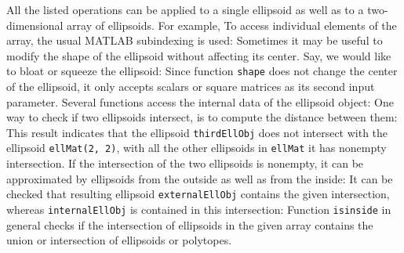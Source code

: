 All the listed operations can be applied to a single ellipsoid as well as to
a two-dimensional array of ellipsoids.
For example,
To access individual elements of the array, the usual MATLAB subindexing
is used:
Sometimes it may be useful to modify the shape of the ellipsoid without
affecting its center. Say, we would like to bloat or squeeze the ellipsoid:
Since function {\tt shape} does not change the center of the ellipsoid,
it only accepts scalars or square matrices as its second input parameter.
\newpage
Several functions  access the internal data of
the ellipsoid object:
One way to check if two ellipsoids intersect, is to compute
the distance between them:
This result indicates that the ellipsoid {\tt thirdEllObj} does not intersect with
the ellipsoid {\tt ellMat(2, 2)}, with all the other ellipsoids in {\tt ellMat}
it has nonempty intersection. If the intersection of the two ellipsoids is
nonempty, it can be approximated by ellipsoids from the outside as well as
from the inside:
It can be checked that resulting ellipsoid {\tt externalEllObj} contains the given
intersection, whereas {\tt internalEllObj} is contained in this intersection:
Function {\tt isinside} in general checks if the intersection of ellipsoids
in the given array contains the union or intersection of ellipsoids or
polytopes.

